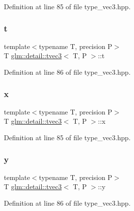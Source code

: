 Definition at line 85 of file type\+\_\+vec3.\+hpp.

\mbox{\label{structglm_1_1detail_1_1tvec3_a9d0e9fe332bb2d7f4bdd427193dec825}} 
\subsubsection{\texorpdfstring{t}{t}}
{\footnotesize\ttfamily template$<$typename T, precision P$>$ \\
T \hyperlink{structglm_1_1detail_1_1tvec3}{glm\+::detail\+::tvec3}$<$ T, P $>$\+::t}



Definition at line 86 of file type\+\_\+vec3.\+hpp.

\mbox{\label{structglm_1_1detail_1_1tvec3_a9c7bc0ecd949a50b911cda1800c4a9c6}} 
\subsubsection{\texorpdfstring{x}{x}}
{\footnotesize\ttfamily template$<$typename T, precision P$>$ \\
T \hyperlink{structglm_1_1detail_1_1tvec3}{glm\+::detail\+::tvec3}$<$ T, P $>$\+::x}



Definition at line 85 of file type\+\_\+vec3.\+hpp.

\mbox{\label{structglm_1_1detail_1_1tvec3_a3de16793bf75ea1e959c3d044709ded7}} 
\subsubsection{\texorpdfstring{y}{y}}
{\footnotesize\ttfamily template$<$typename T, precision P$>$ \\
T \hyperlink{structglm_1_1detail_1_1tvec3}{glm\+::detail\+::tvec3}$<$ T, P $>$\+::y}



Definition at line 86 of file type\+\_\+vec3.\+hpp.

